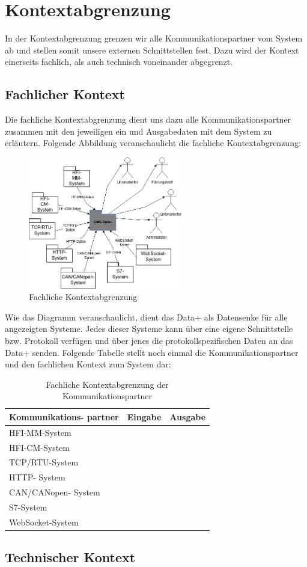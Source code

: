 \chapter{Kontextabgrenzung}
\label{ch:Kontextabgrenzung}
In der Kontextabgrenzung grenzen wir alle Kommunikationspartner vom System ab und stellen somit unsere externen Schnittstellen fest. Dazu wird der Kontext einerseits fachlich, als auch technisch voneinander abgegrenzt.
\section{Fachlicher Kontext}
Die fachliche Kontextabgrenzung dient uns dazu alle Kommunikationspartner zusammen mit den jeweiligen ein und Ausgabedaten mit dem System zu erläutern. Folgende Abbildung veranschaulicht die fachliche Kontextabgrenzung:
\begin{figure}[h]
	\centering
	\includegraphics[width=0.6\textwidth]{Graphics/fachliche_kontextabgrenzung.png}
	\caption{Fachliche Kontextabgrenzung}
	\label{fig:fachliche_kontextabgrenzung}
\end{figure}

Wie das Diagramm veranschaulicht, dient das Data+ als Datensenke für alle angezeigten Systeme. Jedes dieser Systeme kann über eine eigene Schnittstelle bzw. Protokoll verfügen und über jenes die protokollspezifischen Daten an das Data+ senden.
Folgende Tabelle stellt noch einmal die Kommunikationspartner und den fachlichen Kontext zum System dar:

\begin{table}[t]
	\begin{tabularx}{\textwidth}{|p{3cm}|X|X|}
		\hline
		Kommunikations-
		partner & Eingabe & Ausgabe \\
		\hline
		HFI-MM-System & & \\
		\hline
		HFI-CM-System & & \\
		\hline
		TCP/RTU-System & & \\
		\hline
		HTTP-
		System & & \\
		\hline
		CAN/CANopen-
		System & & \\
		\hline
		S7-System & & \\
		\hline
		WebSocket-System & & \\
		\hline
	\end{tabularx} 
	\caption{Fachliche Kontextabgrenzung der Kommunikationspartner}
	\label{tab:FachlicheKontextabgrenzungDerKommunikationspartner}
\end{table}

\section{Technischer Kontext}
